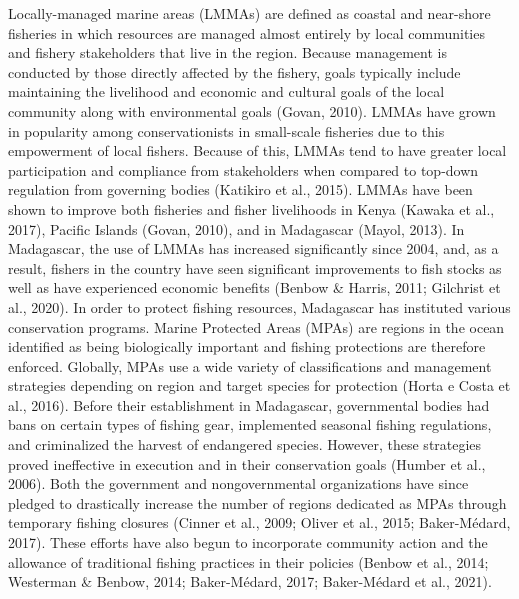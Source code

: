 \documentclass[
  12pt,
]{article}
\begin{document}
Locally-managed marine areas (LMMAs) are defined as coastal and near-shore fisheries in which resources are managed almost entirely by local communities and fishery stakeholders that live in the region. Because management is conducted by those directly affected by the fishery, goals typically include maintaining the livelihood and economic and cultural goals of the local community along with environmental goals (Govan, 2010). LMMAs have grown in popularity among conservationists in small-scale fisheries due to this empowerment of local fishers. Because of this, LMMAs tend to have greater local participation and compliance from stakeholders when compared to top-down regulation from governing bodies (Katikiro et al., 2015). LMMAs have been shown to improve both fisheries and fisher livelihoods in Kenya (Kawaka et al., 2017), Pacific Islands (Govan, 2010), and in Madagascar (Mayol, 2013). In Madagascar, the use of LMMAs has increased significantly since 2004, and, as a result, fishers in the country have seen significant improvements to fish stocks as well as have experienced economic benefits (Benbow \& Harris, 2011; Gilchrist et al., 2020). In order to protect fishing resources, Madagascar has instituted various conservation programs. Marine Protected Areas (MPAs) are regions in the ocean identified as being biologically important and fishing protections are therefore enforced. Globally, MPAs use a wide variety of classifications and management strategies depending on region and target species for protection (Horta e Costa et al., 2016). Before their establishment in Madagascar, governmental bodies had bans on certain types of fishing gear, implemented seasonal fishing regulations, and criminalized the harvest of endangered species. However, these strategies proved ineffective in execution and in their conservation goals (Humber et al., 2006). Both the government and nongovernmental organizations have since pledged to drastically increase the number of regions dedicated as MPAs through temporary fishing closures (Cinner et al., 2009; Oliver et al., 2015; Baker-Médard, 2017). These efforts have also begun to incorporate community action and the allowance of traditional fishing practices in their policies (Benbow et al., 2014; Westerman \& Benbow, 2014; Baker-Médard, 2017; Baker-Médard et al., 2021).
\end{document}
